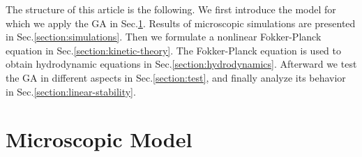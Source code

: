 \documentclass[reprint,floatfix,amsmath,amssymb,aps,pre,showkeys,showpacs,superscriptaddress]{revtex4-1}
\begin{document}
The structure of this article is the following. We first introduce the model for which we apply the GA  in Sec.\ref{section:model}. Results of microscopic simulations are presented in Sec.\ref{section:simulations}. Then we formulate a nonlinear Fokker-Planck equation in Sec.\ref{section:kinetic-theory}. The Fokker-Planck equation is used to obtain hydrodynamic equations in Sec.\ref{section:hydrodynamics}. Afterward we test the GA in different aspects in Sec.\ref{section:test}, and finally analyze its behavior in Sec.\ref{section:linear-stability}.


\section{Microscopic Model}
\label{section:model}
\end{document}
